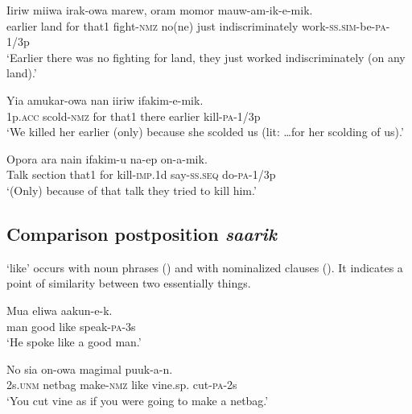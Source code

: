 \ea%
\label{ex:x756}
\gll Iiriw miiwa   irak-owa marew, oram momor mauw-am-ik-e-mik.\\
earlier land for that1 fight-\textsc{nmz} no(ne) just indiscriminately work-\textsc{ss}.\textsc{sim}-be-\textsc{pa}-1/3p\\
\glt`Earlier there was no fighting for land, they just worked indiscriminately (on any land).'
\z

\ea%
\label{ex:x1876}
\gll Yia amukar-owa   nan iiriw ifakim-e-mik. \\
1p.\textsc{acc} scold-\textsc{nmz} for that1 there earlier kill-\textsc{pa}-1/3p\\
\glt`We killed her earlier (only) because she scolded us (lit: {\dots}for her scolding of us).'
\z

\ea%
\label{ex:x759}
\gll Opora ara nain  ifakim-u na-ep on-a-mik. \\
Talk section that1 for kill-\textsc{imp}.1d say-\textsc{ss}.\textsc{seq} do-\textsc{pa}-1/3p\\
\glt`(Only) because of that talk they tried to kill him.'
\z

\subsection{Comparison postposition \textit{saarik}}
{}
 `like' occurs with noun phrases () and with nominalized clauses (). It indicates a point of similarity between two essentially  things.

\ea%
\label{ex:x760}
\gll Mua eliwa  aakun-e-k. \\
man good like speak-\textsc{pa}-3s\\
\glt`He spoke like a good man.'
\z

\ea%
\label{ex:x761}
\gll No sia on-owa  magimal puuk-a-n. \\
2s.\textsc{unm} netbag make-\textsc{nmz} like vine.sp. cut-\textsc{pa}-2s\\
\glt`You cut  vine as if you were going to make a netbag.'
\z

